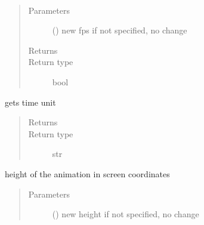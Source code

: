 \documentclass[letterpaper,10pt,english]{sphinxmanual}
\begin{document}
\begin{fulllineitems}
\begin{fulllineitems}
\begin{quote}
\begin{description}
\end{description}\end{quote}

\end{fulllineitems}


\begin{fulllineitems}
\label{\detokenize{Reference:salabim.Environment.fps}}~\begin{quote}\begin{description}
\item[{Parameters}] \leavevmode
{} () \textendash{} new fps 
if not specified, no change

\item[{Returns}] \leavevmode
{}

\item[{Return type}] \leavevmode
bool

\end{description}\end{quote}

\end{fulllineitems}


\begin{fulllineitems}
\label{\detokenize{Reference:salabim.Environment.get_time_unit}}
gets time unit
\begin{quote}\begin{description}
\item[{Returns}] \leavevmode
{}

\item[{Return type}] \leavevmode
str

\end{description}\end{quote}

\end{fulllineitems}


\begin{fulllineitems}
\label{\detokenize{Reference:salabim.Environment.height}}
height of the animation in screen coordinates
\begin{quote}\begin{description}
\item[{Parameters}] \leavevmode
{} () \textendash{} new height 
if not specified, no change


\end{description}
\end{quote}
\end{fulllineitems}
\end{fulllineitems}
\end{document}
